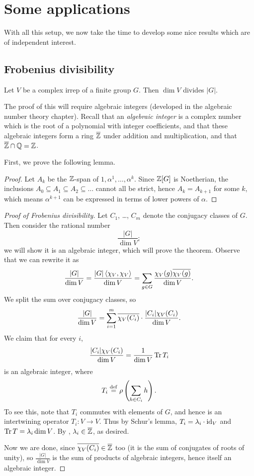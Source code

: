 \chapter{Some applications}
With all this setup, we now take the time to develop some nice
results which are of independent interest.

\section{Frobenius divisibility}
\begin{theorem}
	Let $V$ be a complex irrep of a finite group $G$.
	Then $\dim V$ divides $|G|$.
\end{theorem}
The proof of this will require algebraic integers
(developed in the algebraic number theory chapter).
Recall that an \emph{algebraic integer} is a complex number
which is the root of a polynomial with integer coefficients,
and that these algebraic integers form a ring $\overline{\mathbb Z}$
under addition and multiplication, and that $\overline{\mathbb Z} \cap \mathbb Q = \mathbb Z$.

First, we prove the following lemma.
\newcommand{\tempuuujbhtkx}{$\ZZ[G]$}
\begin{proof}
	Let $A_k$ be the $\mathbb Z$-span of $1, \alpha^1, \dots, \alpha^k$.
	Since $\mathbb Z[G]$ is Noetherian,
	the inclusions $A_0 \subseteq A_1 \subseteq A_2 \subseteq \dots$
	cannot all be strict, hence $A_k = A_{k+1}$ for some $k$,
	which means $\alpha^{k+1}$ can be expressed in terms of
	lower powers of $\alpha$.
\end{proof}

\begin{proof}
	[Proof of Frobenius divisibility]
	Let $C_1$, \dots, $C_m$ denote the conjugacy classes of $G$.
	Then consider the rational number \[ \frac{|G|}{\dim V}; \]
	we will show it is an algebraic integer, which will prove the theorem.
	Observe that we can rewrite it as
	\[
		\frac{|G|}{\dim V}
		= \frac{|G| \left< \chi_V, \chi_V \right>}{\dim V}
		= \sum_{g \in G} \frac{\chi_V(g) \overline{\chi_V(g)}}{\dim V}.
	\]
	We split the sum over conjugacy classes, so
	\[
		\frac{|G|}{\dim V}
		=
		\sum_{i=1}^m \overline{\chi_V(C_i)} \cdot \frac{|C_i| \chi_V(C_i)}{\dim V}.
	\]
	We claim that for every $i$,
	\[ \frac{|C_i| \chi_V(C_i)}{\dim V}
		= \frac{1}{\dim V} \operatorname{Tr} T_i \]
	is an algebraic integer,
	where \[ T_i \overset{\mathrm{def}}{=} \rho\left(\sum_{h \in C_i} h\right). \]
	To see this, note that $T_i$ commutes with elements of $G$,
	and hence is an intertwining operator $T_i : V \to V$.
	Thus by Schur's lemma, $T_i = \lambda_i \cdot \mathrm{id}_V$
	and $\operatorname{Tr} T = \lambda_i \dim V$.
	By , $\lambda_i \in \overline{\mathbb Z}$, as desired.
	
	Now we are done, since $ \in \ol\ZZ$ too
	(it is the sum of conjugates of roots of unity),
	so $$ is the sum of products of algebraic integers,
	hence itself an algebraic integer.
\end{proof}

